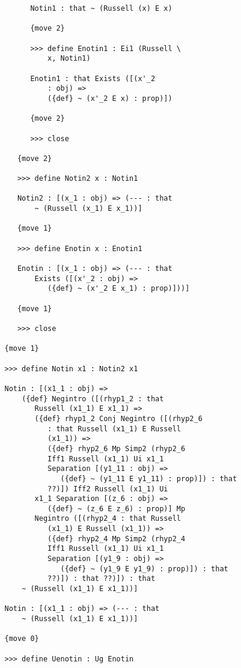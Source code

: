\documentclass[12pt]{article}
\begin{document}
\begin{verbatim}
         Notin1 : that ~ (Russell (x) E x)

         {move 2}

         >>> define Enotin1 : Ei1 (Russell \
             x, Notin1)

         Enotin1 : that Exists ([(x'_2 
             : obj) => 
             ({def} ~ (x'_2 E x) : prop)])

         {move 2}

         >>> close

      {move 2}

      >>> define Notin2 x : Notin1

      Notin2 : [(x_1 : obj) => (--- : that 
          ~ (Russell (x_1) E x_1))]

      {move 1}

      >>> define Enotin x : Enotin1

      Enotin : [(x_1 : obj) => (--- : that 
          Exists ([(x'_2 : obj) => 
             ({def} ~ (x'_2 E x_1) : prop)]))]

      {move 1}

      >>> close

   {move 1}

   >>> define Notin x1 : Notin2 x1

   Notin : [(x1_1 : obj) => 
       ({def} Negintro ([(rhyp1_2 : that 
          Russell (x1_1) E x1_1) => 
          ({def} rhyp1_2 Conj Negintro ([(rhyp2_6 
             : that Russell (x1_1) E Russell 
             (x1_1)) => 
             ({def} rhyp2_6 Mp Simp2 (rhyp2_6 
             Iff1 Russell (x1_1) Ui x1_1 
             Separation [(y1_11 : obj) => 
                ({def} ~ (y1_11 E y1_11) : prop)]) : that 
             ??)]) Iff2 Russell (x1_1) Ui 
          x1_1 Separation [(z_6 : obj) => 
             ({def} ~ (z_6 E z_6) : prop)] Mp 
          Negintro ([(rhyp2_4 : that Russell 
             (x1_1) E Russell (x1_1)) => 
             ({def} rhyp2_4 Mp Simp2 (rhyp2_4 
             Iff1 Russell (x1_1) Ui x1_1 
             Separation [(y1_9 : obj) => 
                ({def} ~ (y1_9 E y1_9) : prop)]) : that 
             ??)]) : that ??)]) : that 
       ~ (Russell (x1_1) E x1_1))]

   Notin : [(x1_1 : obj) => (--- : that 
       ~ (Russell (x1_1) E x1_1))]

   {move 0}

   >>> define Uenotin : Ug Enotin


\end{verbatim}
\end{document}
